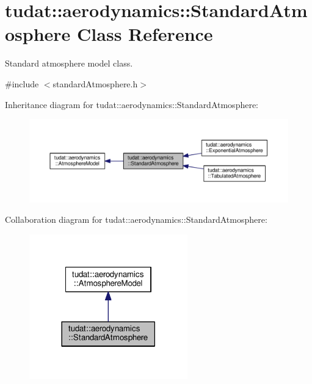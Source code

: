 \hypertarget{classtudat_1_1aerodynamics_1_1StandardAtmosphere}{}\section{tudat\+:\+:aerodynamics\+:\+:Standard\+Atmosphere Class Reference}
\label{classtudat_1_1aerodynamics_1_1StandardAtmosphere}


Standard atmosphere model class.  




{\ttfamily \#include $<$standard\+Atmosphere.\+h$>$}



Inheritance diagram for tudat\+:\+:aerodynamics\+:\+:Standard\+Atmosphere\+:
\nopagebreak
\begin{figure}[H]
\begin{center}
\leavevmode
\includegraphics[width=350pt]{classtudat_1_1aerodynamics_1_1StandardAtmosphere__inherit__graph}
\end{center}
\end{figure}


Collaboration diagram for tudat\+:\+:aerodynamics\+:\+:Standard\+Atmosphere\+:
\nopagebreak
\begin{figure}[H]
\begin{center}
\leavevmode
\includegraphics[width=194pt]{classtudat_1_1aerodynamics_1_1StandardAtmosphere__coll__graph}
\end{center}
\end{figure}
